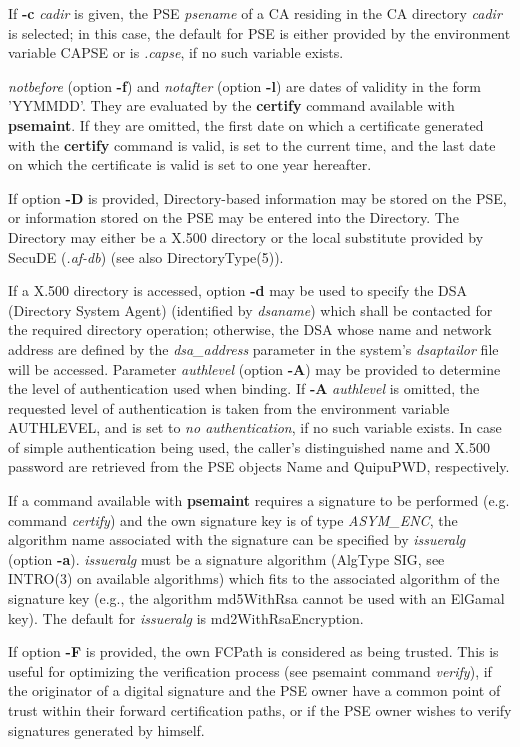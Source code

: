 If {\bf -c} {\em cadir} is given, the PSE {\em psename} of a CA residing in the CA directory {\em cadir}
is selected; in this case, the default for PSE is either provided by the environment
variable CAPSE or is {\em .capse}, if no such variable exists.

{\em notbefore} (option {\bf -f}) and {\em notafter} (option {\bf -l}) are dates of validity in the 
form 'YYMMDD'. They are evaluated by the {\bf certify} command available with {\bf psemaint}. 
If they are omitted, the first date on which a certificate generated with the {\bf certify} command
is valid, is set to the current time, 
and the last date on which the certificate is valid is set to one year hereafter.

If option {\bf -D} is provided, Directory-based information may be stored on the PSE, or
information stored on the PSE may be entered into the Directory.
The Directory may either be a 
X.500 directory or the local substitute provided by 
SecuDE ({\em .af-db}) (see also DirectoryType(5)).

If a X.500 directory is accessed, option {\bf -d} may be used to specify the DSA (Directory System 
Agent) 
(identified by {\em dsaname}) which shall be contacted for the required directory operation; otherwise, the DSA whose name and network address are defined by the {\em dsa\_address} parameter in the system's 
{\em dsaptailor} file will be accessed. 
Parameter {\em authlevel} (option {\bf -A}) may be provided to determine the level of authentication used when binding. If {\bf -A} {\em authlevel} is omitted, the requested 
level of authentication is taken from the environment variable AUTHLEVEL, and is set to {\em no 
authentication}, if no such variable exists.
In case of simple authentication being used, the caller's distinguished name and
X.500 password are retrieved from the PSE objects Name and QuipuPWD, respectively.

If a command available with {\bf psemaint} requires a signature to be performed (e.g. command {\em 
certify}) and the own
signature key is of type {\em ASYM\_ENC}, the algorithm name associated with the signature can be 
specified by {\em issueralg} (option {\bf -a}). {\em issueralg} must be a
signature algorithm (AlgType SIG, see INTRO(3) on available algorithms) which fits to the associated 
algorithm of the signature key (e.g., the algorithm md5WithRsa cannot be used with an ElGamal key).
The default for {\em issueralg} is md2WithRsaEncryption.

If option {\bf -F} is provided, the own FCPath is considered as being trusted.
This is useful for optimizing the verification process (see psemaint command {\em verify}),
if the originator of a digital signature and the PSE owner have a common point of trust
within their forward certification paths, or if the PSE owner wishes to verify signatures
generated by himself.

